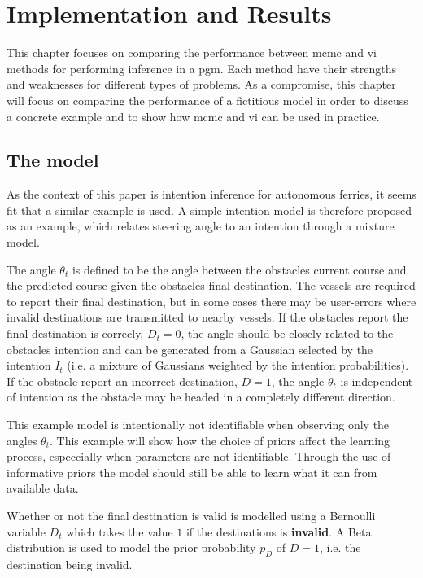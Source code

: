 \chapter{Implementation and Results}

This chapter focuses on comparing the performance between \acrshort{mcmc} and \acrshort{vi} methods for performing inference in a \acrshort{pgm}. Each method have their strengths and weaknesses for different types of problems. As a compromise, this chapter will focus on comparing the performance of a fictitious model in order to discuss a concrete example and to show how \acrshort{mcmc} and \acrshort{vi} can be used in practice.  

\section{The model}
As the context of this paper is intention inference for autonomous ferries, it seems fit that a similar example is used. A simple intention model is therefore proposed as an example, which relates steering angle to an intention through a mixture model. 

The angle $\theta_t$ is defined to be the angle between the obstacles current course and the predicted course given the obstacles final destination. The vessels are required to report their final destination, but in some cases there may be user-errors where invalid destinations are transmitted to nearby vessels. If the obstacles report the final destination is correcly, $D_t=0$, the angle should be closely related to the obstacles intention and can be generated from a Gaussian selected by the intention $I_t$ (i.e. a mixture of Gaussians weighted by the intention probabilities). If the obstacle report an incorrect destination, $D=1$, the angle $\theta_t$ is independent of intention as the obstacle may he headed in a completely different direction.

This example model is intentionally not identifiable when observing only the angles $\theta_t$. This example will show how the choice of priors affect the learning process, especcially when parameters are not identifiable. Through the use of informative priors the model should still be able to learn what it can from available data.   

Whether or not the final destination is valid is modelled using a Bernoulli variable $D_t$ which takes the value $1$ if the destinations is \textbf{invalid}. A Beta distribution is used to model the prior probability $p_D$ of $D=1$, i.e. the destination being invalid.  

